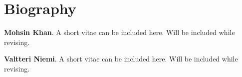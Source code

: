 \documentclass{river-journal}
\begin{document}
\section*{Biography}


\medskip
\noindent
{\bf Mohsin Khan}. A short vitae can be included here. Will be included while revising.




\medskip
\noindent
{\bf Valtteri Niemi}. A short vitae can be included here. Will be included while revising.
\end{document}
